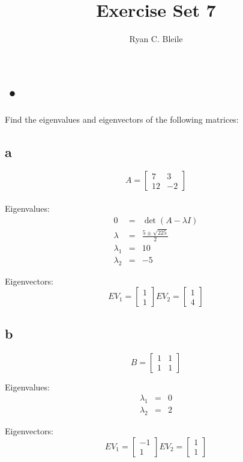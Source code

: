\documentclass[12pt]{article}
\title{Exercise Set 7}
\author{Ryan C. Bleile}
\begin{document}
\maketitle

\section{•}
Find the eigenvalues and eigenvectors of the following matrices:

\subsection*{a}

\[
A =
\begin{bmatrix}
7 & 3\\
12 & -2
\end{bmatrix}
\]
\\
Eigenvalues:
\begin{eqnarray*}
0 &=& \det (A - \lambda I )\\
\lambda &=& \frac{5 \pm \sqrt{225}}{2}\\
\lambda_{1} &=& 10\\
\lambda_{2} &=& -5  
\end{eqnarray*}

Eigenvectors:
\[
EV_1 =
\begin{bmatrix}
1\\
1
\end{bmatrix}
EV_2 =
\begin{bmatrix}
1\\
4
\end{bmatrix}
\]

\subsection*{b}

\[
B = 
\begin{bmatrix}
1 & 1\\
1 & 1
\end{bmatrix}
\]

Eigenvalues:
\begin{eqnarray*}
\lambda_1 &=& 0\\
\lambda_2 &=& 2 
\end{eqnarray*}

Eigenvectors:
\[
EV_1 =
\begin{bmatrix}
-1\\
1
\end{bmatrix}
EV_2 =
\begin{bmatrix}
1\\
1
\end{bmatrix}
\]
\end{document}
